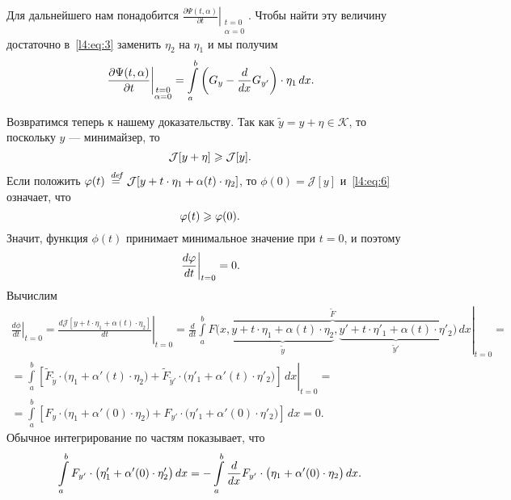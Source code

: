 \documentclass[12pt,a4paper,openany,fleqn]{book}
\newcommand {\defeq}{\stackrel{\hspace{0.09 cm}de\!f}{=}}
\newcommand {\eqdef}{\defeq}
\newcommand{\J}{\ensuremath{\mathcal{J}}}
\newcommand{\mc}[1]{\ensuremath{\mathcal{#1}}}
\newcommand{\der}[2]{\ensuremath{\frac{d#1}{d#2}}}
\newcommand{\pder}[2]{\ensuremath{\frac{\partial#1}{\partial#2}}}
\newcommand{\K}{\mc{K}}
\theoremstyle{definition}
\begin{document}
Для дальнейшего нам понадобится $\displaystyle\left.\pder{\Psi(t,\alpha)}{t}\right|_{\substack{t=0\\\alpha=0}}$. Чтобы найти эту величину достаточно в~\eqref{l4:eq:3} заменить $\eta_2$ на $\eta_1$ и мы получим 
\begin{equation}
	\label{l4:eq:5}
	\hfill\left.\pder{\Psi(t,\alpha)}{t}\right|_{\substack{t=0\\\alpha=0}}=\int\limits_a^b\left(G_y-\der{}{x}G_{y'}\right)\cdot\eta_1\,dx.\hfill
\end{equation}

Возвратимся теперь к нашему доказательству. Так как $\tilde{y}=y+\eta\in\K$, то поскольку $y$ --- минимайзер, то 
\begin{equation}
	\label{l4:eq:6}
	\hfill\J[y+\eta]\geqslant\J[y].\hfill
\end{equation} 
Если положить $\phi(t)\eqdef\J[y+t\cdot\eta_1+\alpha(t)\cdot\eta_2]$, то $\phi(0)=\J[y]$ и~\eqref{l4:eq:6} означает, что 
\begin{equation}
	\label{l4:eq:7}
	\hfill\phi(t)\geqslant\phi(0).\hfill
\end{equation} 
Значит, функция $\phi(t)$ принимает минимальное значение при $t=0$, и поэтому 
\begin{equation}
	\label{l4:eq:8}
	\hfill\left.\der{\phi}{t}\right|_{t=0}=0.\hfill
\end{equation} 
Вычислим
\begin{multline}
	\label{l4:eq:9}
	\left.\der{\phi}{t}\right|_{t=0}=\left.\der{\J[y+t\cdot\eta_1+\alpha(t)\cdot\eta_2]}{t}\right|_{t=0}=\left.\der{}{t}\int\limits_a^b \overbrace{F\big(x,\underbrace{y+t\cdot\eta_1+\alpha(t)\cdot\eta_2}_{\tilde{y}},\underbrace{y'+t\cdot\eta'_1+\alpha(t)\cdot\eta'_2}_{\tilde{y}'}\big)}^{\widetilde{F}}\,dx\right|_{t=0}=\\
	=\left.\int\limits_a^b\left[\widetilde{F}_{\tilde{y}}\cdot\big(\eta_1+\alpha'(t)\cdot\eta_2\big)+\widetilde{F}_{\tilde{y}'}\cdot\big(\eta'_1+\alpha'(t)\cdot\eta'_2\big)\right]\,dx\right|_{t=0}=\\
	=\int\limits_a^b\left[{F}_{{y}}\cdot\big(\eta_1+\alpha'(0)\cdot\eta_2\big)+{F}_{y'}\cdot\big(\eta'_1+\alpha'(0)\cdot\eta'_2\big)\right]\,dx=0.
\end{multline}
Обычное интегрирование по частям показывает, что
\begin{equation}
	\label{l4:eq:10}
	\hfill\int\limits_a^b F_{y'}\cdot\big(\eta'_1+\alpha'(0)\cdot\eta'_2\big)\,dx=-\int\limits_a^b\der{}{x}F_{y'}\cdot\big(\eta_1+\alpha'(0)\cdot\eta_2\big)\,dx.\hfill
\end{equation}
\end{document}
